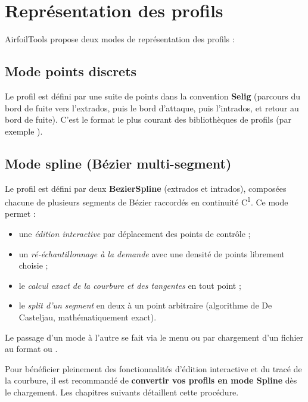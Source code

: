 \section{Représentation des profils}

AirfoilTools propose deux modes de représentation des profils :

\subsection*{Mode points discrets}

Le profil est défini par une suite de points dans la convention
\textbf{Selig} (parcours du bord de fuite vers l'extrados, puis
le bord d'attaque, puis l'intrados, et retour au bord de fuite).
C'est le format le plus courant des bibliothèques de profils
(par exemple ).

\subsection*{Mode spline (Bézier multi-segment)}

Le profil est défini par deux \textbf{BezierSpline} (extrados et
intrados), composées chacune de plusieurs segments de Bézier
raccordés en continuité C\textsuperscript{1}. Ce mode permet :

\begin{itemize}
    \item une \emph{édition interactive} par déplacement des
        points de contrôle ;
    \item un \emph{ré-échantillonnage à la demande} avec une
        densité de points librement choisie ;
    \item le \emph{calcul exact de la courbure et des tangentes}
        en tout point ;
    \item le \emph{split d'un segment} en deux à un point arbitraire
        (algorithme de De Casteljau, mathématiquement exact).
\end{itemize}

Le passage d'un mode à l'autre se fait via le menu
 ou par chargement
d'un fichier au format  ou .

\begin{astuce}
Pour bénéficier pleinement des fonctionnalités d'édition
interactive et du tracé de la courbure, il est recommandé
de \textbf{convertir vos profils en mode Spline} dès le
chargement. Les chapitres suivants détaillent cette procédure.
\end{astuce}
